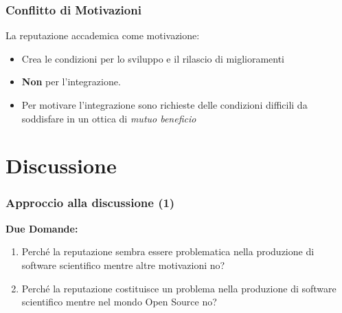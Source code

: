 \begin{frame}\frametitle{Conflitto di Motivazioni}

La reputazione accademica come \alert{motivazione}:

\begin{itemize}[<+->]
\itemsep1pt\parskip0pt
\item
  Crea le condizioni per lo sviluppo e il rilascio di miglioramenti
\item
  \textbf{Non} per l'integrazione.
\item
  Per motivare l'integrazione sono richieste delle condizioni
  \alert{difficili} da soddisfare in un ottica di
  \alert{\em{mutuo beneficio}}
\end{itemize}


\end{frame}

\section{Discussione}

\begin{frame}\frametitle{Approccio alla discussione (1)}

\textbf{Due Domande:}

\begin{enumerate}[<+->]
\def\labelenumi{\arabic{enumi}.}
\item
  Perché la reputazione sembra essere problematica nella produzione di
  software scientifico mentre altre motivazioni no?
\item
  Perché la reputazione costituisce un problema nella produzione di
  software scientifico mentre nel mondo Open Source no?
\end{enumerate}

\end{frame}

